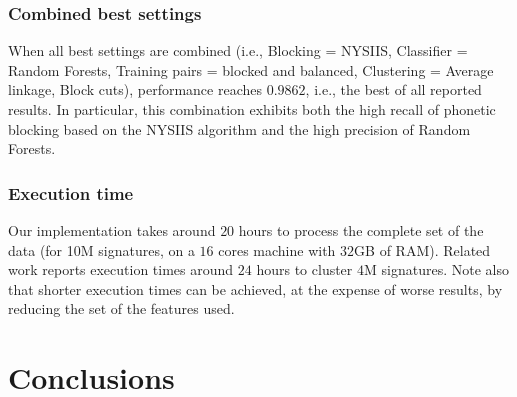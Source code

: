 \documentclass[runningheads,a4paper]{llncs}
\makeatletter
\newcommand*{\ie}{i.e.\@\xspace}
\newcommand{\longpage}{\enlargethispage{\baselineskip}}
\makeatother
\begin{document}
\subsubsection{Combined best settings} When all best settings are combined (\ie, Blocking = NYSIIS, Classifier = Random Forests, Training
pairs = blocked and balanced, Clustering = Average linkage, Block cuts),
performance reaches $0.9862$, \ie, the best of all reported results. In particular,
this combination exhibits both the high recall of phonetic blocking based on the NYSIIS algorithm and the high precision of Random Forests.

\subsubsection{Execution time} Our implementation takes around $20$ hours to process the complete set of the data (for 10M signatures, on a $16$ cores machine with $32$GB of RAM). Related work \cite{khabsa2014large} reports execution times around $24$ hours to cluster $4$M signatures. Note also that shorter execution times can be achieved, at the expense of worse results, by reducing the set of the features used.



\section{Conclusions}
\label{conclusions}

\longpage
\end{document}
